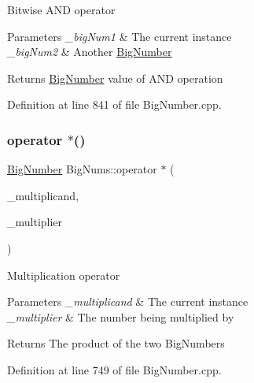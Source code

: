 Bitwise A\+ND operator 
\begin{DoxyParams}{Parameters}
{\em \+\_\+big\+Num1} & The current instance \\
\hline
{\em \+\_\+big\+Num2} & Another \mbox{\hyperlink{class_big_nums_1_1_big_number}{Big\+Number}} \\
\hline
\end{DoxyParams}
\begin{DoxyReturn}{Returns}
\mbox{\hyperlink{class_big_nums_1_1_big_number}{Big\+Number}} value of A\+ND operation 
\end{DoxyReturn}


Definition at line 841 of file Big\+Number.\+cpp.

\mbox{\label{namespace_big_nums_a04ca82b2b679febecf3ac11a4fd58db1}} 
\subsubsection{\texorpdfstring{operator $\ast$()}{operator *()}}
{\footnotesize\ttfamily \mbox{\hyperlink{class_big_nums_1_1_big_number}{Big\+Number}} Big\+Nums\+::operator $\ast$ (\begin{DoxyParamCaption}\item[{\mbox{\hyperlink{class_big_nums_1_1_big_number}{Big\+Number}}}]{\+\_\+multiplicand,  }\item[{const \mbox{\hyperlink{class_big_nums_1_1_big_number}{Big\+Number}} \&}]{\+\_\+multiplier }\end{DoxyParamCaption})}

Multiplication operator 
\begin{DoxyParams}{Parameters}
{\em \+\_\+multiplicand} & The current instance \\
\hline
{\em \+\_\+multiplier} & The number being multiplied by \\
\hline
\end{DoxyParams}
\begin{DoxyReturn}{Returns}
The product of the two Big\+Numbers 
\end{DoxyReturn}


Definition at line 749 of file Big\+Number.\+cpp.

\mbox{\label{namespace_big_nums_a45951a2fb9f239876c94c8917b4d7ad1}} 
